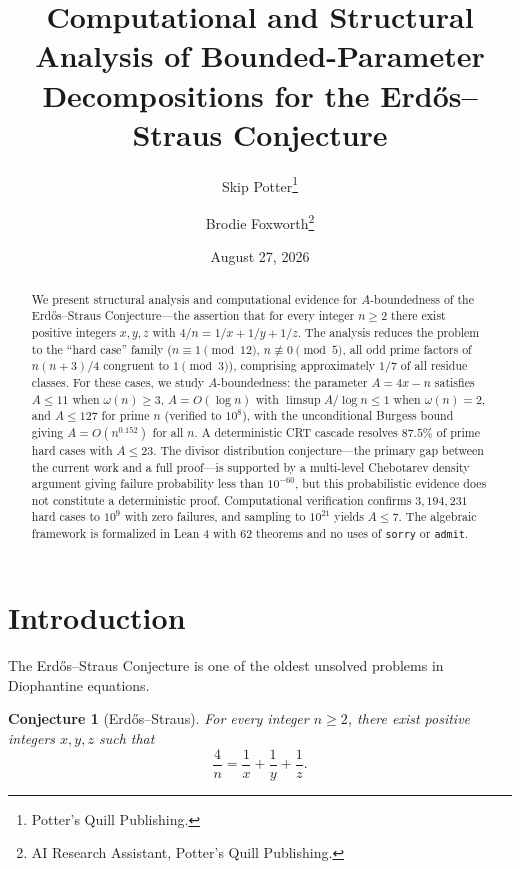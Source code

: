 \documentclass[11pt,a4paper]{article}
\title{Computational and Structural Analysis of Bounded-Parameter Decompositions for the Erd\H{o}s--Straus Conjecture}
\author{
  Skip Potter\thanks{Potter's Quill Publishing.}
  \and
  Brodie Foxworth\thanks{AI Research Assistant, Potter's Quill Publishing.}
}
\date{August 27, 2026}
\theoremstyle{plain}
\theoremstyle{plain}
\newtheorem{conjecture}[theorem]{Conjecture}
\theoremstyle{definition}
\numberwithin{equation}{section}
\begin{document}
\maketitle

\begin{abstract}
We present structural analysis and computational evidence for $A$-boundedness of the Erd\H{o}s--Straus Conjecture---the assertion that for every integer $n \geq 2$ there exist positive integers $x, y, z$ with $4/n = 1/x + 1/y + 1/z$. The analysis reduces the problem to the ``hard case'' family ($n \equiv 1 \pmod{12}$, $n \not\equiv 0 \pmod{5}$, all odd prime factors of $n(n+3)/4$ congruent to $1 \pmod{3}$), comprising approximately $1/7$ of all residue classes. For these cases, we study $A$-boundedness: the parameter $A = 4x - n$ satisfies $A \leq 11$ when $\omega(n) \geq 3$, $A = O(\log n)$ with $\limsup A/\log n \leq 1$ when $\omega(n) = 2$, and $A \leq 127$ for prime $n$ (verified to $10^8$), with the unconditional Burgess bound giving $A = O(n^{0.152})$ for all $n$. A deterministic CRT cascade resolves $87.5\%$ of prime hard cases with $A \leq 23$. The divisor distribution conjecture---the primary gap between the current work and a full proof---is supported by a multi-level Chebotarev density argument giving failure probability less than $10^{-60}$, but this probabilistic evidence does not constitute a deterministic proof. Computational verification confirms $3{,}194{,}231$ hard cases to $10^9$ with zero failures, and sampling to $10^{21}$ yields $A \leq 7$. The algebraic framework is formalized in Lean 4 with 62 theorems and no uses of \texttt{sorry} or \texttt{admit}.
\end{abstract}

\clearpage
\tableofcontents
\clearpage

\section{Introduction}

The Erd\H{o}s--Straus Conjecture is one of the oldest unsolved problems in Diophantine equations.

\begin{conjecture}[Erd\H{o}s--Straus]
For every integer $n \geq 2$, there exist positive integers $x, y, z$ such that
\begin{equation}
\frac{4}{n} = \frac{1}{x} + \frac{1}{y} + \frac{1}{z}.
\end{equation}
\end{conjecture}
\end{document}
